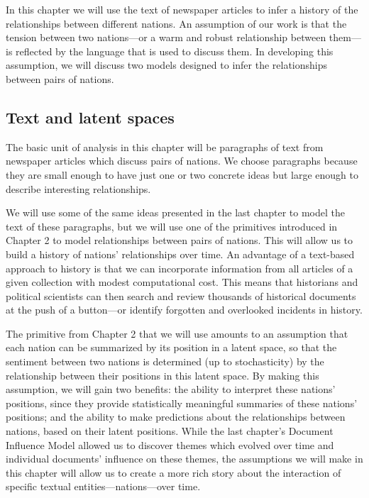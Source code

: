 In this chapter we will use the text of newspaper articles to infer a
history of the relationships between different nations.  An assumption
of our work is that the tension between two nations---or a warm and
robust relationship between them---is reflected by the language that
is used to discuss them.  In developing this assumption, we will
discuss two models designed to infer the relationships between pairs
of nations.

\subsection*{Text and latent spaces}
The basic unit of analysis in this chapter will be paragraphs of text
from newspaper articles which discuss pairs of nations.  We choose
paragraphs because they are small enough to have just one or two
concrete ideas but large enough to describe interesting
relationships.

We will use some of the same ideas presented in the last chapter to
model the text of these paragraphs, but we will use one of the
primitives introduced in Chapter 2 to model relationships between
pairs of nations.  This will allow us to build a history of nations'
relationships over time.  An advantage of a text-based approach to
history is that we can incorporate information from all articles of a
given collection with modest computational cost.  This means that
historians and political scientists can then search and review
thousands of historical documents at the push of a button---or
identify forgotten and overlooked incidents in history.

The primitive from Chapter 2 that we will use amounts to an assumption
that each nation can be summarized by its position in a latent space,
so that the sentiment between two nations is determined (up to
stochasticity) by the relationship between their positions in this
latent space.  By making this assumption, we will gain two benefits:
the ability to interpret these nations' positions, since they provide
statistically meaningful summaries of these nations' positions; and
the ability to make predictions about the relationships between
nations, based on their latent positions. While the last chapter's
Document Influence Model allowed us to discover themes which evolved
over time and individual documents' influence on these themes, the
assumptions we will make in this chapter will allow us to create a
more rich story about the interaction of specific textual
entities---nations---over time.

